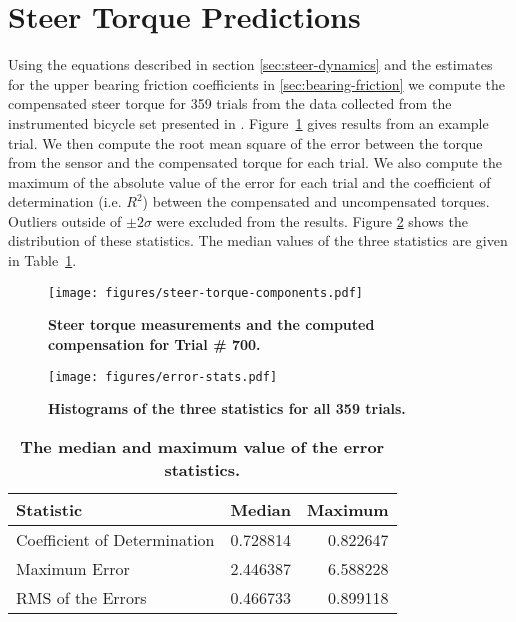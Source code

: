 \documentclass[10pt]{article}
\begin{document}

\section*{Steer Torque Predictions}

Using the equations described in section \ref{sec:steer-dynamics} and the
estimates for the upper bearing friction coefficients in
\ref{sec:bearing-friction} we compute the compensated steer torque for 359
trials from the data collected from the instrumented bicycle set presented in
\cite{Moore2012}. Figure~\ref{fig:steer-torque-components} gives results from
an example trial. We then compute the root mean square of the error between
the torque from the sensor and the compensated torque for each trial. We also
compute the maximum of the absolute value of the error for each trial and the
coefficient of determination (i.e. $R^2$) between the compensated and
uncompensated torques. Outliers outside of $\pm2 \sigma$ were excluded from
the results. Figure \ref{fig:error-stats} shows the distribution of these
statistics. The median values of the three statistics are given in
Table~\ref{tab:medians}.

\begin{figure}
  \centering
  \texttt{[image: figures/steer-torque-components.pdf]}
  \caption{{\bf Steer torque measurements and the computed compensation for Trial \#
    700.}}
  \label{fig:steer-torque-components}
\end{figure}

\begin{figure}
  \centering
  \texttt{[image: figures/error-stats.pdf]}
  \caption{{\bf Histograms of the three statistics for all 359 trials.}}
  \label{fig:error-stats}
\end{figure}

\begin{table}
  \caption{{\bf The median and maximum value of the error statistics.}}
  \centering
  \begin{tabular}{lrr}
    \hline
    Statistic                    & Median   & Maximum \\
    \hline
    Coefficient of Determination & 0.728814 & 0.822647 \\
    Maximum Error                & 2.446387 & 6.588228 \\
    RMS of the Errors            & 0.466733 & 0.899118
  \end{tabular}
  \label{tab:medians}
\end{table}
\end{document}
